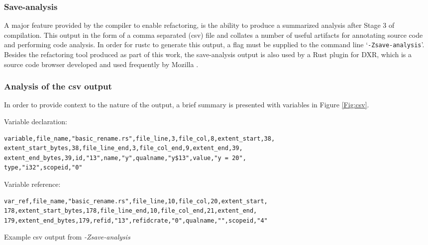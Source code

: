 \subsubsection{Save-analysis}
A major feature provided by the compiler to enable refactoring, is the ability to produce a summarized analysis after Stage 3 of compilation. This output in the form of a comma separated (csv) file and collates a number of useful artifacts for annotating source code and performing code analysis. In order for rustc to generate this output, a flag must be supplied to the command line `{\verb|-Zsave-analysis|}'. Besides the refactoring tool produced as part of this work, the save-analysis output is also used by a Rust plugin for DXR, which is a source code browser developed and used frequently by Mozilla \cite{dxr15}.  


\subsubsection{Analysis of the csv output}
In order to provide context to the nature of the output, a brief summary is presented with variables in Figure \ref{Fig:csv}.

\begin{fig}
\vspace{5mm}
\noindent
Variable declaration:
\begin{verbatim}
variable,file_name,"basic_rename.rs",file_line,3,file_col,8,extent_start,38,
extent_start_bytes,38,file_line_end,3,file_col_end,9,extent_end,39,
extent_end_bytes,39,id,"13",name,"y",qualname,"y$13",value,"y = 20",
type,"i32",scopeid,"0"
\end{verbatim}

\noindent
Variable reference:
\begin{verbatim}
var_ref,file_name,"basic_rename.rs",file_line,10,file_col,20,extent_start,
178,extent_start_bytes,178,file_line_end,10,file_col_end,21,extent_end,
179,extent_end_bytes,179,refid,"13",refidcrate,"0",qualname,"",scopeid,"4"
\end{verbatim}

\caption{Example csv output from \emph{-Zsave-analysis}}
\label{Fig:csv}
\end{fig}

